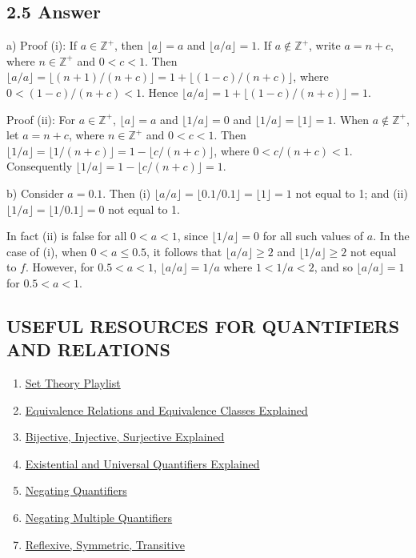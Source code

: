 \documentclass{article}
\begin{document}
\subsection*{2.5 Answer}
a) Proof (i): If \( a \in \mathbb{Z}^+ \), then \( \lfloor a \rfloor = a \) and \( \lfloor a/a \rfloor = 1 \). If \( a \notin \mathbb{Z}^+ \), write \( a = n + c \), where \( n \in \mathbb{Z}^+ \) and \( 0 < c < 1 \). Then \( \lfloor a/a \rfloor = \lfloor (n + 1)/(n + c) \rfloor = 1 + \lfloor (1 - c)/(n + c) \rfloor \), where \( 0 < (1 - c)/(n + c) < 1 \). Hence \( \lfloor a/a \rfloor = 1 + \lfloor (1 - c)/(n + c) \rfloor = 1 \).

Proof (ii): For \( a \in \mathbb{Z}^+ \), \( \lfloor a \rfloor = a \) and \( \lfloor 1/a \rfloor = 0 \) and \( \lfloor 1/a \rfloor = \lfloor 1 \rfloor = 1 \). When \( a \notin \mathbb{Z}^+ \), let \( a = n + c \), where \( n \in \mathbb{Z}^+ \) and \( 0 < c < 1 \). Then \( \lfloor 1/a \rfloor = \lfloor 1/(n + c) \rfloor = 1 - \lfloor c/(n + c) \rfloor \), where \( 0 < c/(n + c) < 1 \). Consequently \( \lfloor 1/a \rfloor = 1 - \lfloor c/(n + c) \rfloor = 1 \).

b) Consider \( a = 0.1 \). Then
(i) \( \lfloor a/a \rfloor = \lfloor 0.1/0.1 \rfloor = \lfloor 1 \rfloor = 1 \) not equal to 1; and
(ii) \( \lfloor 1/a \rfloor = \lfloor 1/0.1 \rfloor = 0 \) not equal to 1.

In fact (ii) is false for all \( 0 < a < 1 \), since \( \lfloor 1/a \rfloor = 0 \) for all such values of \( a \). In the case of (i), when \( 0 < a \leq 0.5 \), it follows that \( \lfloor a/a \rfloor \geq 2 \) and \( \lfloor 1/a \rfloor \geq 2 \) not equal to \( f \). However, for \( 0.5 < a < 1 \), \( \lfloor a/a \rfloor = 1/a \) where \( 1 < 1/a < 2 \), and so \( \lfloor a/a \rfloor = 1 \) for \( 0.5 < a < 1 \).
\newpage
\subsection*{USEFUL RESOURCES FOR QUANTIFIERS AND RELATIONS}
\begin{enumerate}
    \item \href{https://www.youtube.com/watch?v=tyDKR4FG3Yw&list=PLDDGPdw7e6Ag1EIznZ-m-qXu4XX3A0cIz}{Set Theory Playlist}
    \item \href{https://www.youtube.com/watch?v=ZgcTX16borA}{Equivalence Relations and Equivalence Classes Explained}
    \item \href{https://www.youtube.com/watch?v=bZred_Ksz2k&t=6s}{Bijective, Injective, Surjective Explained}
    \item \href{https://www.youtube.com/watch?v=GJpezCUMOxA}{Existential and Universal Quantifiers Explained}
    \item \href{https://www.youtube.com/watch?v=q1rKFGSiZE8}{Negating Quantifiers}
    \item \href{https://www.youtube.com/watch?v=jLVKV5LJjaw}{Negating Multiple Quantifiers}
    \item \href{https://www.youtube.com/watch?v=6fwJj14O_TM}{Reflexive, Symmetric, Transitive}
\end{enumerate}
\newpage
\end{document}

